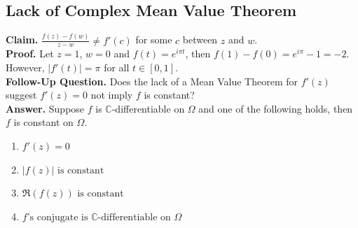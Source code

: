 \documentclass[11pt]{article}
\begin{document}
\subsection{Lack of Complex Mean Value Theorem}
\textbf{Claim.} $\frac{f(z) - f(w)}{z - w} \neq f'(c)$ for some $c$ between $z$ and $w$. \\
\textbf{Proof.} Let $z = 1$, $w = 0$ and $f(t) = e^{i\pi t}$, then $f(1) - f(0) = e^{i\pi} - 1 = -2$. However, $|f'(t)| = \pi$ for all $t \in [0, 1]$. \\
\textbf{Follow-Up Question.} Does the lack of a Mean Value Theorem for $f'(z)$ suggest $f'(z) = 0$ not imply $f$ is constant?  \\
\textbf{Answer.} Suppose $f$ is $\mathbb{C}$-differentiable on $\Omega$ and one of the following holds, then $f$ is constant on $\Omega$. 
\begin{enumerate}[leftmargin = *, nolistsep]
\item $f'(z) = 0$
\item $|f(z)| \text{ is constant}$
\item	$\Re(f(z)) \text{ is constant}$
\item $f \text{'s conjugate is } \mathbb{C} \text{-differentiable on } \Omega$
\end{enumerate}
\end{document}
